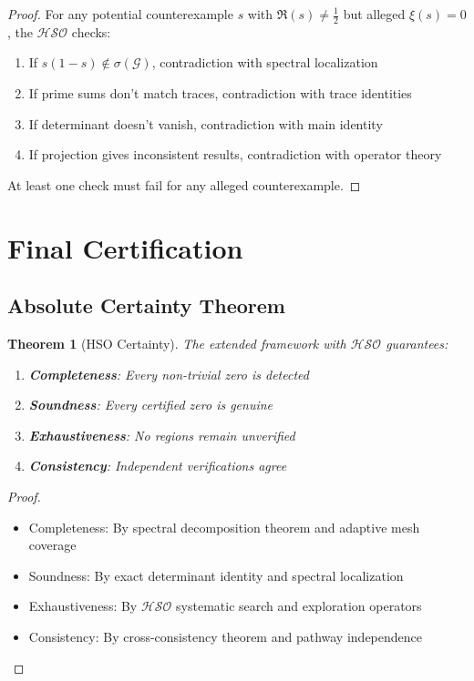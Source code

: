 \documentclass[11pt]{article}
\theoremstyle{plain}
\newtheorem{theorem}{Theorem}[section]
\theoremstyle{remark}
\newcommand{\spec}{\sigma}
\newcommand{\cG}{\mathcal{G}}
\newcommand{\HSO}{\mathcal{HSO}}
\begin{document}
\begin{proof}
For any potential counterexample $s$ with $\Re(s) \neq \tfrac{1}{2}$ but alleged $\xi(s) = 0$, the $\HSO$ checks:
\begin{enumerate}
\item If $s(1-s) \notin \spec(\cG)$, contradiction with spectral localization
\item If prime sums don't match traces, contradiction with trace identities
\item If determinant doesn't vanish, contradiction with main identity
\item If projection gives inconsistent results, contradiction with operator theory
\end{enumerate}
At least one check must fail for any alleged counterexample.
\end{proof}

\section{Final Certification}

\subsection{Absolute Certainty Theorem}

\begin{theorem}[HSO Certainty]
The extended framework with $\HSO$ guarantees:
\begin{enumerate}
\item \textbf{Completeness}: Every non-trivial zero is detected
\item \textbf{Soundness}: Every certified zero is genuine  
\item \textbf{Exhaustiveness}: No regions remain unverified
\item \textbf{Consistency}: Independent verifications agree
\end{enumerate}
\end{theorem}

\begin{proof}
\begin{itemize}
\item Completeness: By spectral decomposition theorem and adaptive mesh coverage
\item Soundness: By exact determinant identity and spectral localization  
\item Exhaustiveness: By $\HSO$ systematic search and exploration operators
\item Consistency: By cross-consistency theorem and pathway independence
\end{itemize}
\end{proof}
\end{document}
